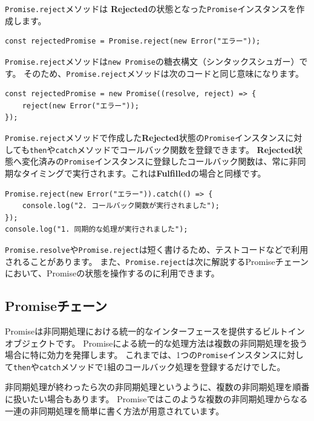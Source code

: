 \texttt{Promise.reject}メソッドは
\textbf{Rejected}の状態となった\texttt{Promise}インスタンスを作成します。

\begin{lstlisting}
const rejectedPromise = Promise.reject(new Error("エラー"));
\end{lstlisting}

\texttt{Promise.reject}メソッドは\texttt{new Promise}の糖衣構文（シンタックスシュガー）です。
そのため、\texttt{Promise.reject}メソッドは次のコードと同じ意味になります。

\begin{lstlisting}
const rejectedPromise = new Promise((resolve, reject) => {
    reject(new Error("エラー"));
});
\end{lstlisting}

\texttt{Promise.reject}メソッドで作成した\textbf{Rejected}状態の\texttt{Promise}インスタンスに対しても\texttt{then}や\texttt{catch}メソッドでコールバック関数を登録できます。
\textbf{Rejected}状態へ変化済みの\texttt{Promise}インスタンスに登録したコールバック関数は、常に非同期なタイミングで実行されます。これは\textbf{Fulfilled}の場合と同様です。

\begin{lstlisting}
Promise.reject(new Error("エラー")).catch(() => {
    console.log("2. コールバック関数が実行されました");
});
console.log("1. 同期的な処理が実行されました");
\end{lstlisting}

\texttt{Promise.resolve}や\texttt{Promise.reject}は短く書けるため、テストコードなどで利用されることがあります。
また、\texttt{Promise.reject}は次に解説するPromiseチェーンにおいて、Promiseの状態を操作するのに利用できます。

\hypertarget{promise-chain}{%
\subsection{Promiseチェーン}\label{promise-chain}}

Promiseは非同期処理における統一的なインターフェースを提供するビルトインオブジェクトです。
Promiseによる統一的な処理方法は複数の非同期処理を扱う場合に特に効力を発揮します。
これまでは、1つの\texttt{Promise}インスタンスに対して\texttt{then}や\texttt{catch}メソッドで1組のコールバック処理を登録するだけでした。

非同期処理が終わったら次の非同期処理というように、複数の非同期処理を順番に扱いたい場合もあります。
Promiseではこのような複数の非同期処理からなる一連の非同期処理を簡単に書く方法が用意されています。

